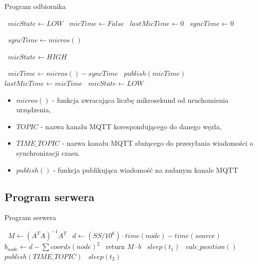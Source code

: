 \begin{algorithm}
\caption{Program odbiornika}\label{alg:sink}
\begin{algorithmic}[1]
    \State\ $micState \gets LOW$
    \State\ $micTime \gets False$
    \State\ $lastMicTime \gets 0$
    \State\ $syncTime \gets 0$

            \State\ $syncTime \gets micros()$
        \EndIf
    \EndFunction

        \State\ $micState \gets HIGH$
    \EndFunction

    \Loop
            \State\ $micTime \gets micros() - syncTime$
            \State\ $publish(micTime)$
            \State\ $lastMicTime \gets micTime$
            \State\ $micState \gets LOW$
        \EndIf
    \EndLoop
\end{algorithmic}
\end{algorithm}

\begin{itemize}
    \item $micros()$ {-} funkcja zwracająca liczbę mikrosekund od uruchomienia urządzenia,
    \item $TOPIC$ {-} nazwa kanału MQTT korespondującego do danego węzła,
    \item $TIME\_TOPIC$ {-} nazwa kanału MQTT służącego do przesyłania wiadomości o synchronizacji czasu.
    \item $publish()$ {-} funkcja publikująca wiadomość na zadanym kanale MQTT
\end{itemize}

\subsection{Program serwera}

\begin{algorithm}
\caption{Program serwera}\label{alg:server}
\begin{algorithmic}[1]
    \State\ $M \gets {\left(A^T A\right)}^{-1} A^T$
            \State\ $d \gets (SS / 10^{6}) \cdot time(node) - time(source)$
            \State\ $b_{node} \gets d - \sum{coords(node)^2}$
        \EndFor
        \State\ return $M \cdot b$
    \EndFunction
        \State\ $sleep(t_1)$
        \State\ $calc\_position()$
    \EndLoop
        \State\ $publish(TIME\_TOPIC)$
        \State\ $sleep(t_2)$
    \EndLoop
\end{algorithmic}
\end{algorithm}

